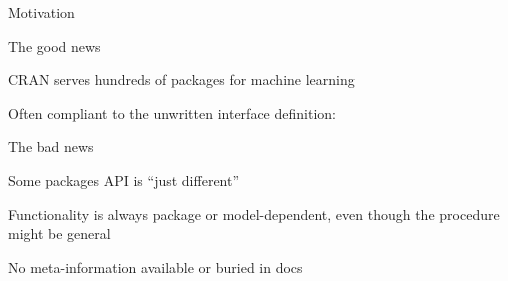 \begin{vframe}{Motivation}
  \begin{blocki}{The good news}
  \item CRAN serves hundreds of packages for machine learning
  \item Often compliant to the unwritten interface definition:
\begin{knitrout}
\color{fgcolor}\begin{kframe}
\begin{alltt}
 \hlkwb{=}  \hlopt{~}   
 \hlkwb{=}   
\end{alltt}
\end{kframe}
\end{knitrout}
  \end{blocki}

  \begin{blocki}{The bad news}
    \item Some packages API is \enquote{just different}
    \item Functionality is always package or model-dependent, even though the procedure might be general
    \item No meta-information available or buried in docs 
  \end{blocki}
\end{vframe}


